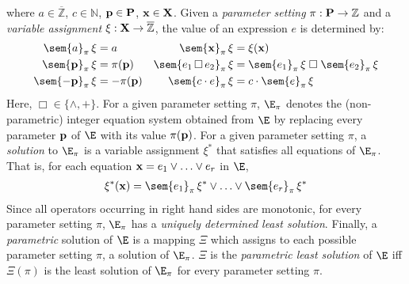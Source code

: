 \documentclass[a4paper]{easychair}
\renewcommand{\qed}{\hfill\mbox{\rule[0pt]{1.3ex}{1.3ex}}}
\newcommand{\ZzZ}{\overline{\mathbb Z}}
\begin{document}
\noindent
where $a\in\ZzZ$, $c\in\mathbb N$, ${\bf p}\in{\bf P}$, ${\bf x}\in{\bf X}$.
Given a \emph{parameter setting} $\pi:{\bf P}\to{\mathbb Z}$ and
a \emph{variable assignment} $\xi : {\bf X}\to\ZzZ$, the value of an expression $e$ is determined by:
\begin{align*}
\sem{a}_\pi\,\xi &= a	  &
\sem{{\bf x}}_\pi\,\xi &= \xi({\bf x})	\\
\sem{{\bf p}}_\pi\,\xi &= \pi({\bf p})	&
\sem{e_1\,\Box\,e_2}_\pi\,\xi &= \sem{e_1}_\pi\,\xi\;\Box\;\sem{e_2}_\pi\,\xi	\\
\sem{-{\bf p}}_\pi\,\xi &= -\pi({\bf p})	&
\sem{c\cdot e}_\pi\,\xi &= c\cdot\sem{e}_\pi\,\xi
\end{align*}
Here, $\Box \in \{\wedge, +\}$.
For a given parameter setting $\pi$, 
$\E_\pi$ denotes the (non-parametric) integer equation system obtained from $\E$ by 
replacing every parameter $\bf p$ of $\E$ with its value $\pi({\bf p})$.
For a given parameter setting $\pi$, a \emph{solution} to $\E_\pi$ 
is a variable assignment $\xi^*$ that satisfies all equations of $\E_\pi$.
That is, for each equation ${\bf x} = e_1\vee\ldots\vee e_r$ in $\E$,
\begin{align*}
  \xi^*({\bf x}) = \sem{e_1}_\pi\,\xi^*\vee\ldots\vee\sem{e_r}_\pi\,\xi^*
\end{align*}
Since all operators occurring in right hand sides are monotonic, for every 
parameter setting $\pi$, $\E_\pi$ has a \emph{uniquely determined least solution}.
Finally, a \emph{parametric} solution of $\E$ is a mapping $\Xi$ which assigns to each possible parameter setting
$\pi$, a solution of $\E_\pi$.
$\Xi$ is the \emph{parametric least solution} of $\E$ iff
$\Xi(\pi)$ is the least solution of $\E_\pi$ for every parameter setting $\pi$.


\end{document}
